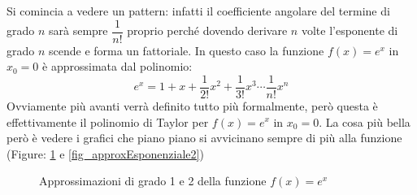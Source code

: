 Si comincia a vedere un pattern: infatti il coefficiente angolare del termine di grado $n$ sarà sempre $\dfrac{1}{n!}$ proprio perché dovendo derivare $n$ volte l'esponente di grado $n$ scende e forma un fattoriale. In questo caso la funzione $f(x) = e^x$ in $x_0 = 0$ è approssimata dal polinomio:
\begin{equation*}
	e^x = 1 + x + \dfrac{1}{2!}x^2 + \dfrac{1}{3!} x^3 \cdots \dfrac{1}{n!} x^n
\end{equation*}
Ovviamente più avanti verrà definito tutto più formalmente, però questa è effettivamente il polinomio di Taylor per $f(x) = e^x$ in $x_0 = 0$. La cosa più bella però è vedere i grafici che piano piano si avvicinano sempre di più alla funzione (Figure: \ref{fig_approxEsponenziale1} e \ref{fig_approxEsponenziale2})

\begin{figure}
\centering
\begin{subfigure}{0.49\textwidth}
\centering
\end{subfigure}
\begin{subfigure}{0.49\textwidth}
\centering
\end{subfigure}
	\caption{Approssimazioni di grado 1 e 2 della funzione $f(x) = e^x$} 
\label{fig_approxEsponenziale1}
\end{figure}


